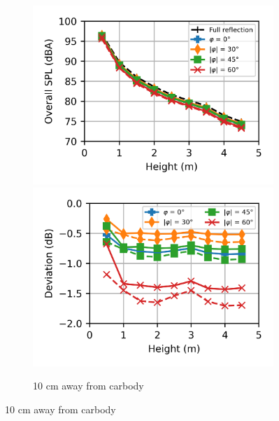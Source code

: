 \begin{figure}[H]
	\centering
	\begin{subfigure}[b]{\textwidth}
		\centering
		\includegraphics{fig/chap5/impedance/overall_SPL/overall_SPL_pos_a.png}
		\includegraphics{fig/chap5/impedance/overall_SPL/deviation_pos_a.png}
		\caption{10 cm away from carbody}
	\end{subfigure}
\end{figure}
